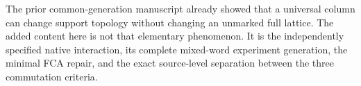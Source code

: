 The prior common-generation manuscript already showed that a universal
column can change support topology without changing an unmarked full
lattice. The added content here is not that elementary phenomenon.
It is the independently specified native interaction, its complete
mixed-word experiment generation, the minimal FCA repair, and the
exact source-level separation between the three commutation criteria.

